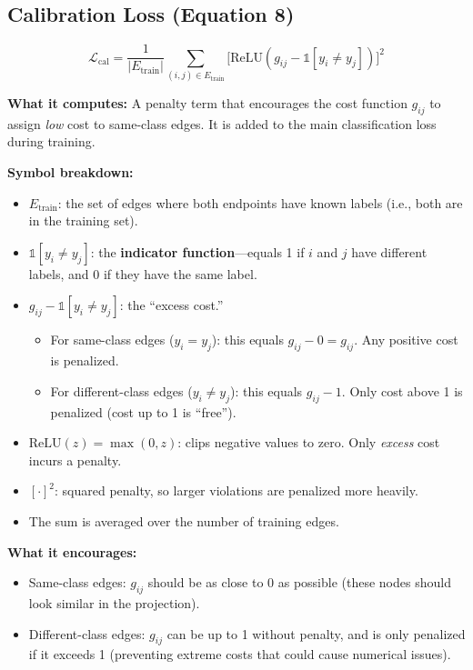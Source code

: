 \documentclass[11pt,a4paper]{article}
\theoremstyle{definition}
\theoremstyle{plain}
\begin{document}
\subsection{Calibration Loss (Equation 8)}
\label{sec:calibration}

\begin{equation}
  \mathcal{L}_{\text{cal}} = \frac{1}{|E_{\text{train}}|}
  \sum_{(i,j) \in E_{\text{train}}}
  \bigl[\mathrm{ReLU}(g_{ij} - \mathbb{1}[y_i \neq y_j])\bigr]^2
  \tag{Eq.~8}
\end{equation}

\textbf{What it computes:}
A penalty term that encourages the cost function $g_{ij}$ to assign \emph{low}
cost to same-class edges.
It is added to the main classification loss during training.

\textbf{Symbol breakdown:}
\begin{itemize}
  \item $E_{\text{train}}$: the set of edges where both endpoints have known labels
    (i.e., both are in the training set).
  \item $\mathbb{1}[y_i \neq y_j]$: the \textbf{indicator function}---equals 1
    if $i$ and $j$ have different labels, and 0 if they have the same label.
  \item $g_{ij} - \mathbb{1}[y_i \neq y_j]$: the ``excess cost.''
    \begin{itemize}[nosep]
      \item For same-class edges ($y_i = y_j$): this equals $g_{ij} - 0 = g_{ij}$.
        Any positive cost is penalized.
      \item For different-class edges ($y_i \neq y_j$): this equals $g_{ij} - 1$.
        Only cost above 1 is penalized (cost up to 1 is ``free'').
    \end{itemize}
  \item $\mathrm{ReLU}(z) = \max(0, z)$: clips negative values to zero.
    Only \emph{excess} cost incurs a penalty.
  \item $[\cdot]^2$: squared penalty, so larger violations are penalized more heavily.
  \item The sum is averaged over the number of training edges.
\end{itemize}

\textbf{What it encourages:}
\begin{itemize}[nosep]
  \item Same-class edges: $g_{ij}$ should be as close to 0 as possible
    (these nodes should look similar in the projection).
  \item Different-class edges: $g_{ij}$ can be up to 1 without penalty,
    and is only penalized if it exceeds 1 (preventing extreme costs that
    could cause numerical issues).
\end{itemize}
\end{document}
